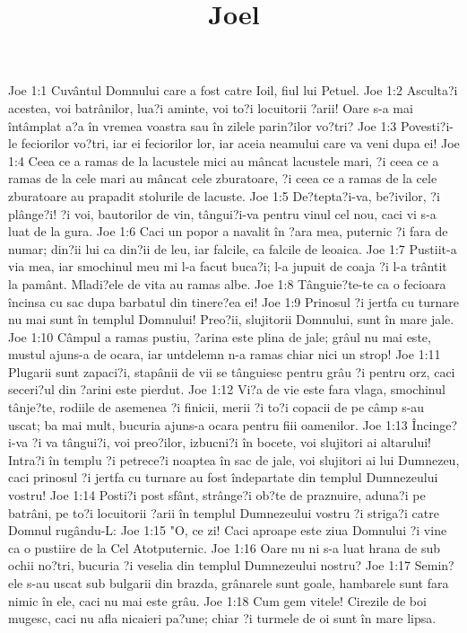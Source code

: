 

\title{Joel}

Joe 1:1  Cuvântul Domnului care a fost catre Ioil, fiul lui Petuel.
Joe 1:2  Asculta?i acestea, voi batrânilor, lua?i aminte, voi to?i locuitorii ?arii! Oare s-a mai întâmplat a?a în vremea voastra sau în zilele parin?ilor vo?tri?
Joe 1:3  Povesti?i-le feciorilor vo?tri, iar ei feciorilor lor, iar aceia neamului care va veni dupa ei!
Joe 1:4  Ceea ce a ramas de la lacustele mici au mâncat lacustele mari, ?i ceea ce a ramas de la cele mari au mâncat cele zburatoare, ?i ceea ce a ramas de la cele zburatoare au prapadit stolurile de lacuste.
Joe 1:5  De?tepta?i-va, be?ivilor, ?i plânge?i! ?i voi, bautorilor de vin, tângui?i-va pentru vinul cel nou, caci vi s-a luat de la gura.
Joe 1:6  Caci un popor a navalit în ?ara mea, puternic ?i fara de numar; din?ii lui ca din?ii de leu, iar falcile, ca falcile de leoaica.
Joe 1:7  Pustiit-a via mea, iar smochinul meu mi l-a facut buca?i; l-a jupuit de coaja ?i l-a trântit la pamânt. Mladi?ele de vita au ramas albe.
Joe 1:8  Tânguie?te-te ca o fecioara încinsa cu sac dupa barbatul din tinere?ea ei!
Joe 1:9  Prinosul ?i jertfa cu turnare nu mai sunt în templul Domnului! Preo?ii, slujitorii Domnului, sunt în mare jale.
Joe 1:10  Câmpul a ramas pustiu, ?arina este plina de jale; grâul nu mai este, mustul ajuns-a de ocara, iar untdelemn n-a ramas chiar nici un strop!
Joe 1:11  Plugarii sunt zapaci?i, stapânii de vii se tânguiesc pentru grâu ?i pentru orz, caci seceri?ul din ?arini este pierdut.
Joe 1:12  Vi?a de vie este fara vlaga, smochinul tânje?te, rodiile de asemenea ?i finicii, merii ?i to?i copacii de pe câmp s-au uscat; ba mai mult, bucuria ajuns-a ocara pentru fiii oamenilor.
Joe 1:13  Încinge?i-va ?i va tângui?i, voi preo?ilor, izbucni?i în bocete, voi slujitori ai altarului! Intra?i în templu ?i petrece?i noaptea în sac de jale, voi slujitori ai lui Dumnezeu, caci prinosul ?i jertfa cu turnare au fost îndepartate din templul Dumnezeului vostru!
Joe 1:14  Posti?i post sfânt, strânge?i ob?te de praznuire, aduna?i pe batrâni, pe to?i locuitorii ?arii în templul Dumnezeului vostru ?i striga?i catre Domnul rugându-L:
Joe 1:15  "O, ce zi! Caci aproape este ziua Domnului ?i vine ca o pustiire de la Cel Atotputernic.
Joe 1:16  Oare nu ni s-a luat hrana de sub ochii no?tri, bucuria ?i veselia din templul Dumnezeului nostru?
Joe 1:17  Semin?ele s-au uscat sub bulgarii din brazda, grânarele sunt goale, hambarele sunt fara nimic în ele, caci nu mai este grâu.
Joe 1:18  Cum gem vitele! Cirezile de boi mugesc, caci nu afla nicaieri pa?une; chiar ?i turmele de oi sunt în mare lipsa.
